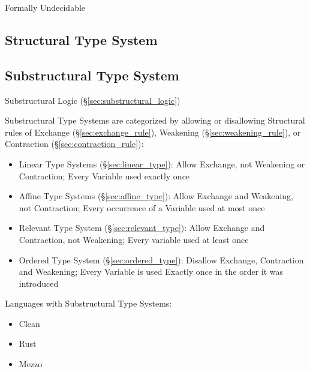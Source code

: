 Formally Undecidable



\subsection{Structural Type System}\label{sec:structural_type_system}

\subsection{Substructural Type System}
\label{sec:substructural_type}

Substructural Logic (\S\ref{sec:substructural_logic})

Substructural Type Systems are categorized by allowing or disallowing
Structural rules of Exchange (\S\ref{sec:exchange_rule}), Weakening
(\S\ref{sec:weakening_rule}), or Contraction
(\S\ref{sec:contraction_rule}):

\begin{itemize}
  \item Linear Type Systems (\S\ref{sec:linear_type}): Allow Exchange,
    not Weakening or Contraction; Every Variable used exactly once
  \item Affine Type Systems (\S\ref{sec:affine_type}): Allow Exchange
    and Weakening, not Contraction; Every occurrence of a Variable
    used at most once
  \item Relevant Type System (\S\ref{sec:relevant_type}): Allow
    Exchange and Contraction, not Weakening; Every variable used at
    least once
  \item Ordered Type System (\S\ref{sec:ordered_type}): Disallow
    Exchange, Contraction and Weakening; Every Variable is used
    Exactly once in the order it was introduced
\end{itemize}

Languages with Substructural Type Systems:

\begin{itemize}
  \item Clean
  \item Rust
  \item Mezzo
\end{itemize}


